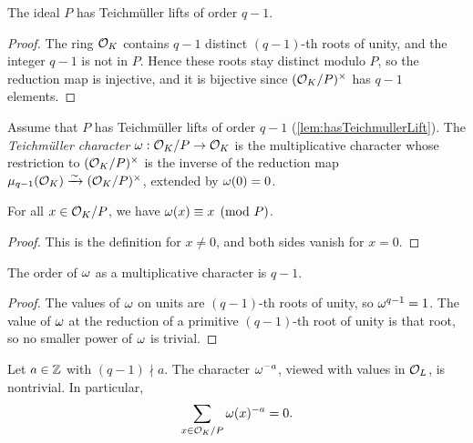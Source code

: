 \begin{lemma}
  \label{lem:hasTeichmullerLift}
  \leanok
  The ideal $P$ has Teichmüller lifts of order $q - 1$.
\end{lemma}

\begin{proof}
  \leanok
  The ring $\mathcal{O}_K$ contains $q - 1$ distinct $(q-1)$-th roots of unity, and the integer $q - 1$
  is not in $P$. Hence these roots stay distinct modulo $P$, so the reduction map is injective,
  and it is bijective since $(\mathcal{O}_K/P)^\times$ has $q - 1$ elements.
\end{proof}

\begin{definition}
  \label{def:teichmuller}
  \leanok
  Assume that $P$ has Teichmüller lifts of order $q - 1$ (\ref{lem:hasTeichmullerLift}).
  The \emph{Teichmüller character} $\omega : \mathcal{O}_K/P \to \mathcal{O}_K$ is the multiplicative character
  whose restriction to $(\mathcal{O}_K/P)^\times$ is the inverse of the reduction map
  $\mu_{q-1}(\mathcal{O}_K) \xrightarrow{\sim} (\mathcal{O}_K/P)^\times$, extended by $\omega(0) = 0$.
\end{definition}

\begin{lemma}
  \label{lem:mk_teichmuller}
  \leanok
  For all $x \in \mathcal{O}_K/P$, we have $\omega(x) \equiv x \pmod{P}$.
\end{lemma}

\begin{proof}
  \leanok
  This is the definition for $x \neq 0$, and both sides vanish for $x = 0$.
\end{proof}

\begin{lemma}
  \label{lem:orderOf_teichmuller}
  \leanok
  The order of $\omega$ as a multiplicative character is $q - 1$.
\end{lemma}

\begin{proof}
  \leanok
  The values of $\omega$ on units are $(q-1)$-th roots of unity, so $\omega^{q-1} = 1$. The value of
  $\omega$ at the reduction of a primitive $(q-1)$-th root of unity is that root, so no smaller
  power of $\omega$ is trivial.
\end{proof}

\begin{lemma}
  \label{lem:teichmuller_sum}
  \leanok
  Let $a \in \mathbb{Z}$ with $(q-1) \nmid a$. The character $\omega^{-a}$, viewed with values in $\mathcal{O}_L$,
  is nontrivial. In particular,
  \[
    \sum_{x \in \mathcal{O}_K/P} \omega(x)^{-a} = 0.
  \]
\end{lemma}

